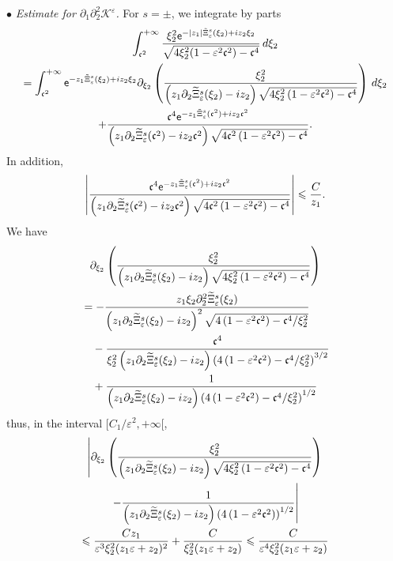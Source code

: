 \documentclass[AHL,Unicode,longabstracts,published]{cedram}
\newcommand*\p{\partial}
\newcommand*\BK{\mathcal{K}}
\newcommand*\ex{{\sf e}}
\newcommand*\cs{{\mathfrak c}}
\newcommand*\ii{\infty}
\newcommand*\ls{\leqslant }
\newcommand*\e{\varepsilon}
\renewcommand*\t{\tilde}
\let\oldtilde\tilde
\renewcommand*{\tilde}[1]{\mathchoice{\widetilde{#1}}{\widetilde{#1}}{\oldtilde{#1}}{\oldtilde{#1}}}
\begin{document}
$ \bullet $ \emph{Estimate for $ \p_1 \p_2^2 \BK^\e $.} For $ s = \pm $, we integrate by parts
\begin{multline}\label{IPP_K122_zero}
\int_{ \cs^2}^{+\ii} \frac{ \xi_2^2 \ex^{- |z_1| \t\Xi_\e^s (\xi_2) + i z_2 \xi_2} }{ \sqrt{ 4 \xi_2^2 (1 - \e^2 \cs^2) - \cs^4 } } \, d\xi_2\\  =
\int_{ \cs^2}^{+\ii} \ex^{- z_1 \t\Xi_\e^s (\xi_2) + i z_2 \xi_2 }
\p_{\xi_2} \left(\frac{ \xi_2^2 }{\left(z_1 \p_2 \t\Xi_\e^s (\xi_2) - i z_2\right) \sqrt{ 4 \xi_2^2 \left(1 - \e^2 \cs^2\right) - \cs^4 } } \right) \, d\xi_2\\
+ \frac{ \cs^4 \ex^{- z_1 \t\Xi_\e^s (\cs^2) + i z_2 \cs^2 } }{ \left(z_1 \p_2 \t\Xi_\e^s (\cs^2) - i z_2 \cs^2\right) \sqrt{ 4 \cs^2 \left(1 - \e^2 \cs^2\right) - \cs^4}}.
\end{multline}
In addition,
\begin{align*}
\left\lvert
\frac{ \cs^4 \ex^{- z_1 \t\Xi_\e^s (\cs^2) + i z_2 \cs^2} }{\left(z_1 \p_2 \t\Xi_\e^s (\cs^2) - i z_2 \cs^2\right)
\sqrt{ 4 \cs^2 \left(1 - \e^2 \cs^2\right) - \cs^4 } } \right\rvert
\ls \frac{C}{z_1 }.
\end{align*}
We have
\begin{multline*}
\p_{\xi_2} \left(\frac{ \xi_2^2 }{ \left(z_1 \p_2 \t\Xi_\e^s (\xi_2) - i z_2\right) \sqrt{ 4 \xi_2^2 \left(1 - \e^2 \cs^2\right) - \cs^4 } } \right)\\
\begin{aligned}
& = - \frac{ z_1 \xi_2 \p_2^2 \t\Xi_\e^s (\xi_2) }{ \left(z_1 \p_2 \t\Xi_\e^s (\xi_2) - i z_2\right)^2 \sqrt{ 4 \left(1 - \e^2 \cs^2\right) - \cs^4 / \xi_2^2} }
\\ & \quad - \frac{ \cs^4 }{ \xi_2^2 \left(z_1 \p_2 \t\Xi_\e^s (\xi_2) - i z_2\right) \left(4 \left(1 - \e^2 \cs^2\right) - \cs^4 /\xi_2^2\right)^{3/2} }
\\ & \quad + \frac{ 1 }{\left(z_1 \p_2 \t\Xi_\e^s (\xi_2) - i z_2\right)\left(4 \left(1 - \e^2 \cs^2\right) - \cs^4 /\xi_2^2\right)^{1/2} }
\end{aligned}
\end{multline*}
thus, in the interval $ [C_1 / \e^{2}, +\ii [$,
\begin{multline*}
\left\lvert  \p_{\xi_2} \left(\frac{ \xi_2^2 }{ \left(z_1 \p_2 \t\Xi_\e^s (\xi_2) - i z_2\right) \sqrt{ 4 \xi_2^2 \left(1 - \e^2 \cs^2\right) - \cs^4}} \right)\right.\\
\left. - \frac{ 1 }{\left(z_1 \p_2 \t\Xi_\e^s (\xi_2) - i z_2\right)\left(4\left(1 - \e^2 \cs^2\right)\right)^{1/2} }
\right\rvert
\\ 
\ls \frac{ C z_1 }{ \e^3 \xi_2^2 (z_1 \e + z_2)^2 } + \frac{ C }{ \xi_2^2 (z_1 \e + z_2) }
\ls \frac{ C }{ \e^4 \xi_2^2 (z_1 \e + z_2) }
\end{multline*}
\end{document}
